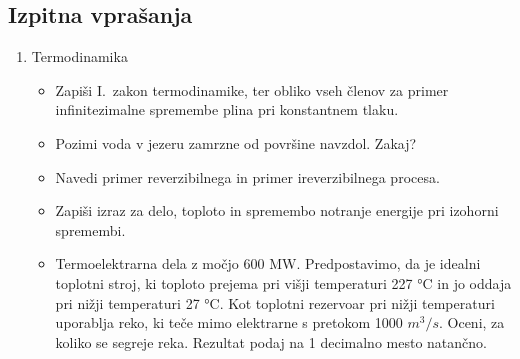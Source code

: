 \newpage
\subsection*{Izpitna vprašanja}
\begin{enumerate}
    \item Termodinamika
    \begin{itemize}
        \item Zapiši I.\ zakon termodinamike, ter obliko vseh členov za primer infinitezimalne spremembe plina pri konstantnem tlaku.
        \item Pozimi voda v jezeru zamrzne od površine navzdol. Zakaj?
        \item Navedi primer reverzibilnega in primer ireverzibilnega procesa.
        \item Zapiši izraz za delo, toploto in spremembo notranje energije pri izohorni spremembi.
        \item Termoelektrarna dela z močjo 600 MW. Predpostavimo, da je idealni toplotni stroj, ki toploto prejema pri višji temperaturi 227 °C in jo oddaja pri nižji temperaturi 27 °C. Kot toplotni rezervoar pri nižji temperaturi uporablja reko, ki teče mimo elektrarne s pretokom 1000 \(m^3/s\). Oceni, za koliko se segreje reka. Rezultat podaj na 1 decimalno mesto natančno.
    \end{itemize}
\end{enumerate}